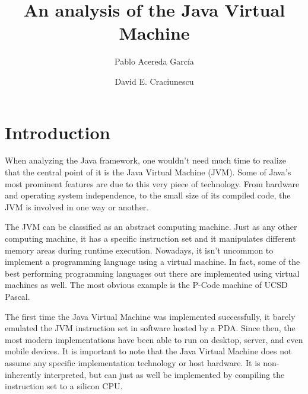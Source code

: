 \documentclass[english,runningheads,a4paper]{llncs}[2018/03/10]
\begin{document}
\title{An analysis of the Java Virtual Machine}

\author{Pablo Acereda García \and David E. Craciunescu}

\maketitle


\section*{Introduction}
When analyzing the Java framework, one wouldn't need much time to realize that
the central point of it is the Java Virtual Machine (JVM). Some of Java's most
prominent features are due to this very piece of technology. From hardware and
operating system independence, to the small size of its compiled code, the JVM
is involved in one way or another.

The JVM can be classified as an abstract computing machine. Just as any other
computing machine, it has a specific instruction set and it manipulates
different memory areas during runtime execution. Nowadays, it isn't uncommon to
implement a programming language using a virtual machine. In fact, some of the
best performing programming languages out there are implemented using virtual
machines as well. The most obvious example is the P-Code machine of UCSD Pascal.

The first time the Java Virtual Machine was implemented successfully, it barely
emulated the JVM instruction set in software hosted by a PDA. Since then, the
most modern implementations have been able to run on desktop, server, and even
mobile devices. It is important to note that the Java Virtual Machine does not
assume any specific implementation technology or host hardware. It is
non-inherently interpreted, but can just as well be implemented by compiling the
instruction set to a silicon CPU.
\end{document}
